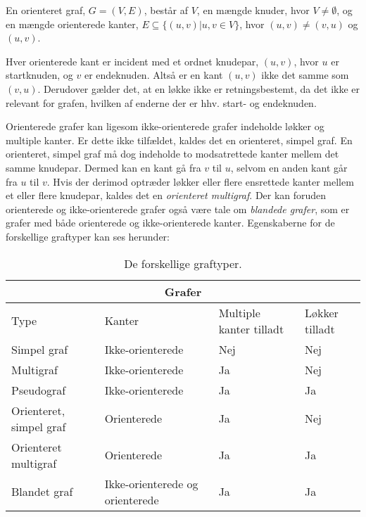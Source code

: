 \begin{defn}  
En orienteret graf, $G=(V,E)$, består af $V$, en mængde knuder, hvor $V \neq \emptyset$, og en mængde orienterede kanter, $E \subseteq \{(u,v)|u,v \in V\}$, hvor $(u,v) \neq (v,u)$ og $(u,v)$. 
\end{defn}

Hver orienterede kant er incident med et ordnet knudepar, $(u,v)$, hvor $u$ er startknuden, og $v$ er endeknuden. Altså er en kant $(u,v)$ ikke det samme som $(v,u)$.
Derudover gælder det, at en løkke ikke er retningsbestemt, da det ikke er relevant for grafen, hvilken af enderne der er hhv. start- og endeknuden.



Orienterede grafer kan ligesom ikke-orienterede grafer indeholde løkker og multiple kanter. Er dette ikke tilfældet, kaldes det en orienteret, simpel graf. En orienteret, simpel graf må dog indeholde to modsatrettede kanter mellem det samme knudepar. Dermed kan en kant gå fra $v$ til $u$, selvom en anden kant går fra $u$ til $v$. Hvis der derimod optræder løkker eller flere ensrettede kanter mellem et eller flere knudepar, kaldes det en \emph{orienteret multigraf}. 
Der kan foruden orienterede og ikke-orienterede grafer også være tale om \emph{blandede grafer}, som er grafer med både orienterede og ikke-orienterede kanter.  
Egenskaberne for de forskellige graftyper kan ses herunder:


\begin{table}[H]
\centering
\begin{tabular}{ |p{4cm}|p{3cm}|p{3cm}|p{2cm}|  }
 \hline
 \multicolumn{4}{|c|}{Grafer} \\
 \hline
 Type & Kanter & Multiple kanter tilladt & Løkker tilladt\\
 \hline
 Simpel graf   & Ikke-orienterede    & Nej &   Nej\\
 Multigraf &   Ikke-orienterede & Ja   & Nej\\
 Pseudograf & Ikke-orienterede & Ja &  Ja\\
 Orienteret, simpel graf    & Orienterede & Ja \footnotemark &  Nej\\
 Orienteret multigraf &  Orienterede  & Ja & Ja\\
 Blandet graf & Ikke-orienterede og orienterede  & Ja   & Ja\\
 \hline
\end{tabular}
\caption{De forskellige graftyper.}
\label{tab:typer}
\end{table}


